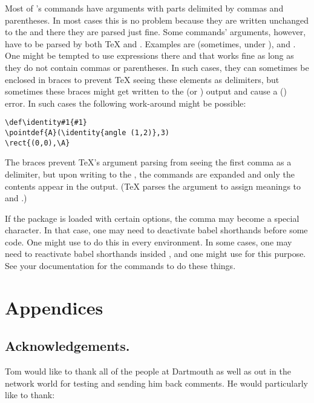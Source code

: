 \documentclass[letterpaper]{article}
\begin{document}
Most of \mfp{}'s commands have arguments with parts delimited by commas
and parentheses. In most cases this is no problem because they are
written unchanged to the  and there they are parsed just fine.
Some commands' arguments, however, have to be parsed by both \TeX{} and
\MF{}. Examples are  (sometimes, under ), and
. One might be tempted to use \MP{} expressions there and
that works fine as long as they do not contain commas or parentheses. In
such cases, they can sometimes be enclosed in braces to prevent \TeX{}
seeing these elements as delimiters, but sometimes these braces might
get written to the  (or ) output and cause a \MF{}
(\MP{}) error. In such cases the following work-around might be possible:
\begin{verbatim}
\def\identity#1{#1}
\pointdef{A}(\identity{angle (1,2)},3)
\rect{(0,0),\A}
\end{verbatim}

The braces prevent \TeX{}'s argument parsing from seeing the first comma
as a delimiter, but upon writing to the , the 
commands are expanded and only the contents appear in the output. (\TeX{}
parses the argument to assign meanings to  and .)

If the  package is loaded with certain options, the comma
may become a special character. In that case, one may need to deactivate
babel shorthands before some \mfp{} code. One might use 
to do this in every  environment. In some cases, one may need
to reactivate babel shorthands insided , and one might use
 for this purpose. See your  documentation
for the commands to do these things.

\clearpage

\def\sectionmark#1{\markright {\thesection\quad#1}}%
\def\subsectionmark#1{}
\def\subsubsectionmark#1{}
\thispagestyle{plain}
\chapter{Appendices}\label{appendices}

\section{Acknowledgements.}\label{acknowledgements}

Tom would like to thank all of the people at Dartmouth as well as out in
the network world for testing \mfp{} and sending him back
comments. He would particularly like to thank:
\end{document}
